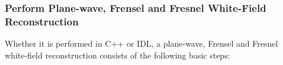 \documentclass[]{nadia}
\begin{document}




\subsubsection{Perform Plane-wave, Frensel and Fresnel White-Field Reconstruction}
\label{subsubsec:rec}

Whether it is performed in C++ or IDL, a plane-wave, Frensel and
Fresnel white-field reconstruction consists of the following basic
steps:
\end{document}

